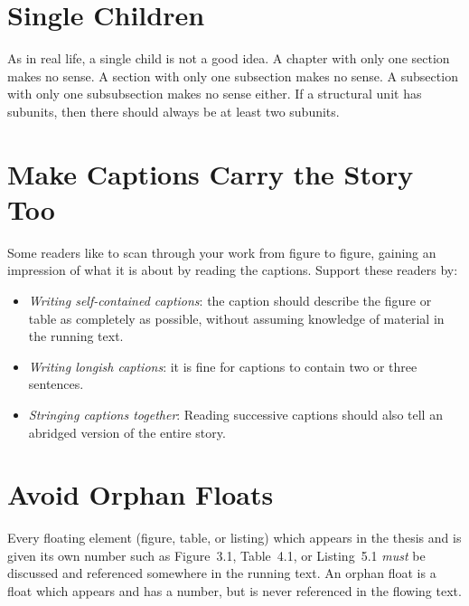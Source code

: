 \section{Single Children}

As in real life, a single child is not a good idea. A chapter with
only one section makes no sense. A section with only one subsection
makes no sense. A subsection with only one subsubsection makes no
sense either. If a structural unit has subunits, then there should
always be at least two subunits.







\section{Make Captions Carry the Story Too}

Some readers like to scan through your work from figure to figure,
gaining an impression of what it is about by reading the captions.
Support these readers by:
\begin{itemize}
\item \emph{Writing self-contained captions}: the caption
should describe the figure or table as completely as possible, without
assuming knowledge of material in the running text.

\item \emph{Writing longish captions}: it is fine for
captions to contain two or three sentences.

\item \emph{Stringing captions together}: Reading successive captions
should also tell an abridged version of the entire story.
\end{itemize}




\section{Avoid Orphan Floats}

Every floating element (figure, table, or listing) which appears in
the thesis and is given its own number such as Figure~3.1, Table~4.1,
or Listing~5.1 \emph{must} be discussed and referenced somewhere in the
running text. An orphan float is a float which appears and has a
number, but is never referenced in the flowing text.


